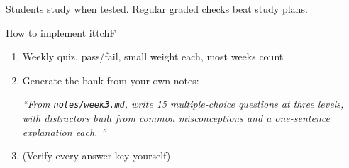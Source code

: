 \documentclass[aspectratio=169, 10pt]{beamer}
\begin{document}

\begin{frame}{Students study when tested. Regular graded checks beat study plans.}

\begin{mckcardg}[mckteal]{How to implement it}{tchF}
  \begin{enumerate}\setlength{\itemsep}{2pt}
  \item Weekly quiz, pass/fail, small weight each, most weeks count
  \item Generate the bank from your own notes: \par
  {\itshape\color{mcknavy}``From \texttt{notes/week3.md}, write 15 multiple-choice questions at three levels, with distractors built from common misconceptions and a one-sentence explanation each. ''}
  \item (Verify every answer key yourself)
\end{enumerate}
\end{mckcardg}

\end{frame}
\end{document}
